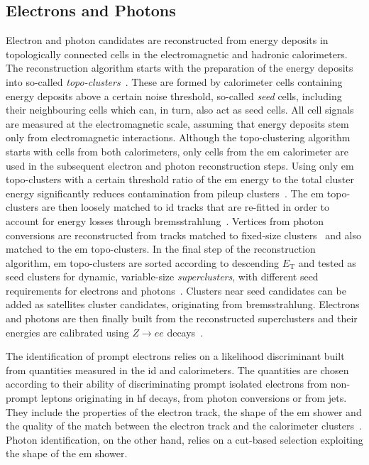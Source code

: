 \subsection{Electrons and Photons}\label{sec:reco_electrons}

Electron and photon candidates are reconstructed from energy deposits in topologically connected cells in the electromagnetic and hadronic calorimeters. The reconstruction algorithm starts with the preparation of the energy deposits into so-called \textit{topo-clusters}~\cite{PERF-2014-07}. These are formed by calorimeter cells containing energy deposits above a certain noise threshold, so-called \textit{seed} cells, including their neighbouring cells which can, in turn, also act as seed cells. All cell signals are measured at the electromagnetic scale, assuming that energy deposits stem only from electromagnetic interactions. Although the topo-clustering algorithm starts with cells from both calorimeters, only cells from the \gls{em} calorimeter are used in the subsequent electron and photon reconstruction steps. Using only \gls{em} topo-clusters with a certain threshold ratio of the \gls{em} energy to the total cluster energy significantly reduces contamination from pileup clusters~\cite{EGAM-2018-01}. The \gls{em} topo-clusters are then loosely matched to \gls{id} tracks that are re-fitted in order to account for energy losses through bremsstrahlung~\cite{EGAM-2018-01}. Vertices from photon conversions are reconstructed from tracks matched to fixed-size clusters~\cite{PERF-2017-02} and also matched to the \gls{em} topo-clusters. In the final step of the reconstruction algorithm, \gls{em} topo-clusters are sorted according to descending $E_{\mathrm{T}}$ and tested as seed clusters for dynamic, variable-size \textit{superclusters}, with different seed requirements for electrons and photons~\cite{EGAM-2018-01}. Clusters near seed candidates can be added as satellites cluster candidates, originating \eg from bremsstrahlung. Electrons and photons are then finally built from the reconstructed superclusters and their energies are calibrated using $Z\rightarrow ee$ decays~\cite{PERF-2017-03}.

The identification of prompt electrons relies on a likelihood discriminant built from quantities measured in the \gls{id} and calorimeters. The quantities are chosen according to their ability of discriminating prompt isolated electrons from non-prompt leptons originating in \gls{hf} decays, from photon conversions or from jets. They include the properties of the electron track, the shape of the \gls{em} shower and the quality of the match between the electron track and the calorimeter clusters~\cite{PERF-2017-01}. Photon identification, on the other hand, relies on a cut-based selection exploiting the shape of the \gls{em} shower.

